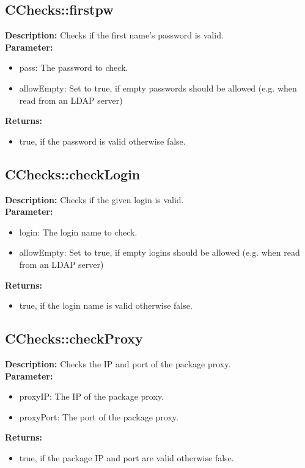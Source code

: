 \subsection{CChecks::firstpw}
\textbf{Description:} Checks if the first name's password is valid.\\
\textbf{Parameter:}
\begin{itemize}
\item pass: The password to check.
\item allowEmpty: Set to true, if empty passwords should be allowed (e.g. when read from an LDAP server)
\end{itemize}
\textbf{Returns:}
\begin{itemize}
\item true, if the password is valid otherwise false.
\end{itemize}

\subsection{CChecks::checkLogin}
\textbf{Description:} Checks if the given login is valid.\\
\textbf{Parameter:}
\begin{itemize}
\item login: The login name to check.
\item allowEmpty: Set to true, if empty logins should be allowed (e.g. when read from an LDAP server)
\end{itemize}
\textbf{Returns:}
\begin{itemize}
\item true, if the login name is valid otherwise false.
\end{itemize}

\subsection{CChecks::checkProxy}
\textbf{Description:} Checks the IP and port of the package proxy.\\
\textbf{Parameter:}
\begin{itemize}
\item proxyIP: The IP of the package proxy.
\item proxyPort: The port of the package proxy.
\end{itemize}
\textbf{Returns:}
\begin{itemize}
\item true, if the package IP and port are valid otherwise false.
\end{itemize}

